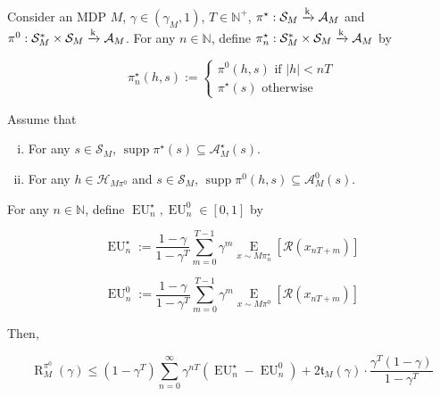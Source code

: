\documentclass[anon,12pt]{colt2018} %
\DeclareMathOperator{\Supp}{supp}
\newcommand{\AP}[1]{\left(#1\right)}
\newcommand{\AB}[1]{\left[#1\right]}
\newcommand{\Ea}[2]{\underset{#1}{\operatorname{E}}\AB{#2}}
\newcommand{\Nats}{\mathbb{N}}
\newcommand{\Abs}[1]{\left\vert #1 \right\vert}
\newcommand{\K}{\xrightarrow{\textnormal{k}}}
\newcommand{\A}{\mathcal{A}}
\newcommand{\St}{\mathcal{S}}
\newcommand{\R}{\mathcal{R}}
\newcommand{\EU}{\operatorname{EU}}
\newcommand{\Rg}{\operatorname{R}}
\newcommand{\MP}[2]{#1#2}
\newcommand{\Tn}{\mathfrak{t}}
\newcommand{\FH}{\mathcal{H}}
\begin{document}
\begin{samepage}
\begin{proposition}
\label{prp:short_long}

Consider an MDP $M$, $\gamma\in\AP{\gamma_M,1}$, $T\in\Nats^+$, $\pi^\star: \St_M \K \A_M$ and $\pi^0: \St_M^* \times \St_M \K \A_M$. For any $n \in \Nats$, define $\pi^\star_n: \St_M^* \times \St_M \K \A_M$ by

$$\pi^\star_n(h,s):=\begin{cases} \pi^0(h,s) \text{ if } \Abs{h} < nT \\ \pi^\star\AP{s} \text{ otherwise} \end{cases}$$

Assume that 

\begin{enumerate}[i.]

\item\label{con:prp__short_long__star} For any $s \in \St_M$, $\Supp{\pi^\star(s)} \subseteq \A_M^\star(s)$.
\item\label{con:prp__short_long__zero} For any $h \in \FH_{M\pi^0}$ and $s \in \St_M$, $\Supp{\pi^0(h,s)} \subseteq \A_{M}^0\AP{s}$.

\end{enumerate}



For any $n \in \Nats$, define $\EU_n^\star,\EU_n^0\in[0,1]$ by

\begin{equation}
\label{eqn:prp__short_long__eu_star}
\EU_n^{\star}:=\frac{1-\gamma}{1-\gamma^T}\sum_{m=0}^{T-1} \gamma^m \Ea{x\sim{\MP{M}{\pi_n^{\star}}}}{\R\AP{x_{nT+m}}}
\end{equation}

\begin{equation}
\label{eqn:prp__short_long__eu_zero}
\EU_n^{0}:=\frac{1-\gamma}{1-\gamma^T}\sum_{m=0}^{T-1} \gamma^m \Ea{x\sim{\MP{M}{\pi^{0}}}}{\R\AP{x_{nT+m}}}
\end{equation}

Then,

\begin{equation}
\Rg^{\pi^0}_M(\gamma) \leq \AP{1-\gamma^T}\sum_{n=0}^\infty \gamma^{nT}\AP{\EU^\star_n-\EU^0_n} + 2\Tn_M(\gamma)\cdot\frac{\gamma^T(1-\gamma)}{1-\gamma^T}
\end{equation}

\end{proposition}
\end{samepage}
\end{document}
